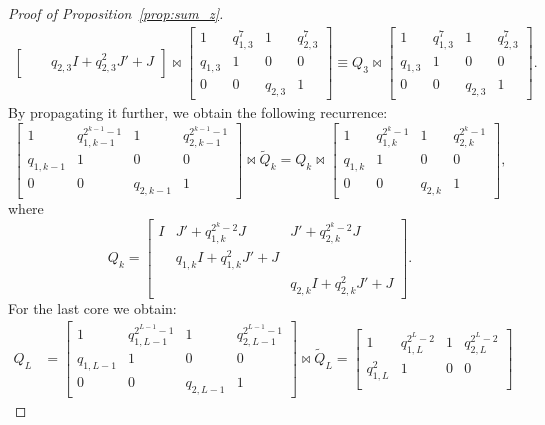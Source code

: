 \documentclass[a4paper]{article}
\newcommand{\LL}{L}
\begin{document}
\begin{proof}[Proof of Proposition~\ref{prop:sum_z}]
\[\begin{split}
\begin{bmatrix}
        & & q_{2,3} I + q_{2,3}^2 J' + J
    \end{bmatrix}
    \Join
    \begin{bmatrix}
        1 & q_{1,3}^7 & 1 & q_{2,3}^7 \\
        q_{1,3} & 1 & 0 & 0 \\
        0 & 0 & q_{2,3} & 1
    \end{bmatrix}
    \equiv 
Q_3 \Join
    \begin{bmatrix}
        1 & q_{1,3}^7 & 1 & q_{2,3}^7 \\
        q_{1,3} & 1 & 0 & 0 \\
        0 & 0 & q_{2,3} & 1
    \end{bmatrix}.
\end{split} 
\]
By propagating it further, we obtain the following recurrence:
\[
    \begin{bmatrix}
        1 & q_{1,k-1}^{2^{k-1}-1} & 1 & q_{2,k-1}^{2^{k-1}-1} \\
        q_{1,k-1}& 1 & 0 & 0 \\
        0 & 0 & q_{2,k-1} & 1 
    \end{bmatrix}
    \Join
    {\widetilde Q}_k
    =
    Q_k \Join 
    \begin{bmatrix}
        1 & q_{1,k}^{2^{k}-1} & 1 & q_{2,k}^{2^{k}-1} \\
        q_{1,k}& 1 & 0 & 0 \\
        0 & 0 & q_{2,k} & 1 
    \end{bmatrix},
\]
where 
\[
    Q_k = 
    \begin{bmatrix}
        I & J' + q_{1,k}^{2^{k}-2} J & J' + q_{2,k}^{2^{k}-2} J \\
        & q_{1,k} I + q_{1,k}^2 J' + J \\
        & & q_{2,k} I + q_{2,k}^2 J' + J
    \end{bmatrix}.
\]
For the last core we obtain:
\[
\begin{split}
Q_\LL &=
    \begin{bmatrix}
        1 & q_{1,\LL-1}^{2^{\LL-1}-1} & 1 & q_{2,\LL-1}^{2^{\LL-1}-1} \\
        q_{1,\LL-1}& 1 & 0 & 0 \\
        0 & 0 & q_{2,\LL-1} & 1 
    \end{bmatrix}
    \Join
    {\widetilde Q}_\LL
    = 
    \begin{bmatrix}
        1 & q_{1,\LL}^{2^{\LL}-2} & 1 & q_{2,\LL}^{2^{\LL}-2} \\
        q_{1,\LL}^2 & 1 & 0 & 0 \\

\end{bmatrix}
\end{split}\]
\end{proof}
\end{document}
